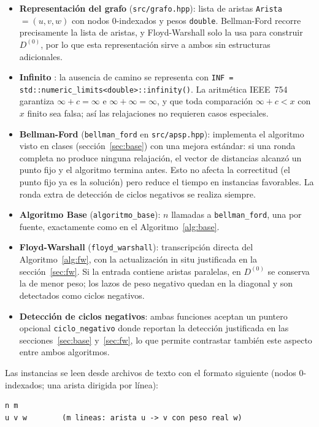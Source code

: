 \documentclass[11pt]{article}
\begin{document}
\begin{itemize}
  \item \textbf{Representación del grafo} (\texttt{src/grafo.hpp}): lista de
  aristas \texttt{Arista}~$=(u,v,w)$ con nodos $0$-indexados y pesos
  \texttt{double}. Bellman-Ford recorre precisamente la lista de aristas, y
  Floyd-Warshall solo la usa para construir $D^{(0)}$, por lo que esta
  representación sirve a ambos sin estructuras adicionales.
  \item \textbf{Infinito} : la ausencia de camino se representa con
  \texttt{INF = std::numeric\_limits<double>::infinity()}. La aritmética
  IEEE~754 garantiza $\infty+c=\infty$ e $\infty+\infty=\infty$, y que toda
  comparación $\infty+c<x$ con $x$ finito sea falsa; así las relajaciones no
  requieren casos especiales.
  \item \textbf{Bellman-Ford} (\texttt{bellman\_ford} en
  \texttt{src/apsp.hpp}): implementa el algoritmo visto en clases
  (sección~\ref{sec:base}) con una
  mejora estándar: si una ronda completa no produce ninguna relajación, el
  vector de distancias alcanzó un punto fijo y el algoritmo termina antes.
  Esto no afecta la correctitud (el punto fijo ya es la solución) pero
  reduce el tiempo en instancias favorables. La ronda extra de detección de
  ciclos negativos se realiza siempre.
  \item \textbf{Algoritmo Base} (\texttt{algoritmo\_base}): $n$ llamadas a
  \texttt{bellman\_ford}, una por fuente, exactamente como en el
  Algoritmo~\ref{alg:base}.
  \item \textbf{Floyd-Warshall} (\texttt{floyd\_warshall}): transcripción
  directa del Algoritmo~\ref{alg:fw}, con la actualización in situ
  justificada en la sección~\ref{sec:fw}. Si la entrada contiene aristas
  paralelas, en $D^{(0)}$ se conserva la de menor peso; los lazos de peso
  negativo quedan en la diagonal y son detectados como ciclos negativos.
  \item \textbf{Detección de ciclos negativos}: ambas funciones aceptan un
  puntero opcional \texttt{ciclo\_negativo} donde reportan la detección
  justificada en las secciones~\ref{sec:base} y~\ref{sec:fw}, lo que
  permite contrastar también este aspecto entre ambos algoritmos.
\end{itemize}

Las instancias se leen desde archivos de texto con el formato siguiente
(nodos $0$-indexados; una arista dirigida por línea):

\begin{lstlisting}[style=texto]
n m
u v w        (m lineas: arista u -> v con peso real w)
\end{lstlisting}
\end{document}
